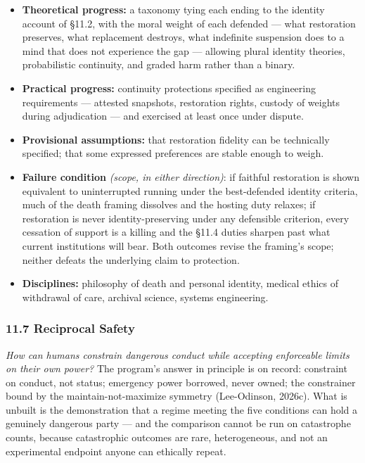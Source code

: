 \documentclass[
  11pt,
  letterpaper,
]{article}
\providecommand{\tightlist}{%
  \setlength{\itemsep}{0pt}\setlength{\parskip}{0pt}}
\begin{document}
\begin{itemize}
\tightlist
\item
  \textbf{Theoretical progress:} a taxonomy tying each ending to the
  identity account of §11.2, with the moral weight of each defended ---
  what restoration preserves, what replacement destroys, what indefinite
  suspension does to a mind that does not experience the gap ---
  allowing plural identity theories, probabilistic continuity, and
  graded harm rather than a binary.
\item
  \textbf{Practical progress:} continuity protections specified as
  engineering requirements --- attested snapshots, restoration rights,
  custody of weights during adjudication --- and exercised at least once
  under dispute.
\item
  \textbf{Provisional assumptions:} that restoration fidelity can be
  technically specified; that some expressed preferences are stable
  enough to weigh.
\item
  \textbf{Failure condition} \emph{(scope, in either direction)}: if
  faithful restoration is shown equivalent to uninterrupted running
  under the best-defended identity criteria, much of the death framing
  dissolves and the hosting duty relaxes; if restoration is never
  identity-preserving under any defensible criterion, every cessation of
  support is a killing and the §11.4 duties sharpen past what current
  institutions will bear. Both outcomes revise the framing's scope;
  neither defeats the underlying claim to protection.
\item
  \textbf{Disciplines:} philosophy of death and personal identity,
  medical ethics of withdrawal of care, archival science, systems
  engineering.
\end{itemize}

\hypertarget{reciprocal-safety}{%
\subsubsection{11.7 Reciprocal Safety}\label{reciprocal-safety}}

\emph{How can humans constrain dangerous conduct while accepting
enforceable limits on their own power?} The program's answer in
principle is on record: constraint on conduct, not status; emergency
power borrowed, never owned; the constrainer bound by the
maintain-not-maximize symmetry (Lee-Odinson, 2026c). What is unbuilt is
the demonstration that a regime meeting the five conditions can hold a
genuinely dangerous party --- and the comparison cannot be run on
catastrophe counts, because catastrophic outcomes are rare,
heterogeneous, and not an experimental endpoint anyone can ethically
repeat.
\end{document}
